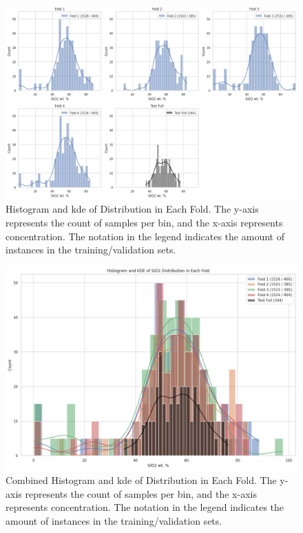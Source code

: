 \begin{figure}[h!]
    \centering
    \includegraphics[width=\textwidth]{images/histogram_grid_plot.png}
    \caption{Histogram and \gls{kde} of  Distribution in Each Fold. The y-axis represents the count of samples per bin, and the x-axis represents  concentration. The notation in the legend indicates the amount of instances in the training/validation sets.}
    \label{fig:histogram_grid_plot}
\end{figure}

\begin{figure}[h!]
    \centering
    \includegraphics[width=\textwidth]{images/histogram_kde_plot.png}
    \caption{Combined Histogram and \gls{kde} of  Distribution in Each Fold. The y-axis represents the count of samples per bin, and the x-axis represents  concentration. The notation in the legend indicates the amount of instances in the training/validation sets.}
    \label{fig:histogram_kde_plot}
\end{figure}

